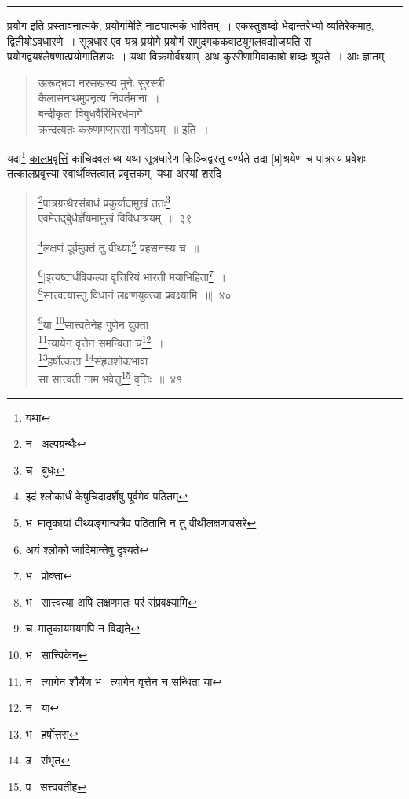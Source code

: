 \documentclass[11pt, openany]{book}
\begin{document}
\hrule

\vspace{5mm}
\noindent
\underline{प्रयोग} इति प्रस्तावनात्मके, \underline{प्रयोग}मिति नाट्यात्मकं भावितम्~। एकस्तुशब्दो भेदान्तरेभ्यो व्यतिरेकमाह, द्वितीयोऽवधारणे~। सूत्रधार एव यत्र प्रयोगे प्रयोगं समुद्गककवाटयुगलवद्योजयति स प्रयोगद्वयश्लेषणात्प्रयोगातिशयः~। यथा विक्रमोर्वश्याम्\textendash\ अथ कुररीणामिवाकाशे शब्दः श्रूयते~। आः ज्ञातम्\textendash

\begin{quote}
{\qt ऊरूद्भवा नरसखस्य मुनेः सुरस्त्री\\
कैलासनाथमुपनृत्य निवर्तमाना~।\\
बन्दीकृता विबुधवैरिभिरर्धमार्गे\\
क्रन्दत्यतः करुणमप्सरसां गणोऽयम्~॥} इति~।
\end{quote}

\noindent
यदा\renewcommand{\thefootnote}{1}\footnote{यथा} \underline{कालप्रवृत्तिं} कांचिदवलम्ब्य यथा सूत्रधारेण किञ्चिद्वस्तु वर्ण्यते तदा [प्र]श्रयेण च पात्रस्य प्रवेशः तत्कालप्रवृत्त्या स्वार्थोक्तत्वात् प्रवृत्तकम्, यथा {\qt अस्यां शरदि\textendash }

\newpage

\begin{quote}
{\na \renewcommand{\thefootnote}{1}\footnote{न \textendash\ अल्पग्रन्थैः}पात्रग्रन्थैरसंबाधं प्रकुर्यादामुखं ततः\renewcommand{\thefootnote}{2}\footnote{च \textendash\ बुधः}~।\\
एवमेतद्बुेधैर्ज्ञेयमामुखं विविधाश्रयम्~॥~३९

\renewcommand{\thefootnote}{3}\footnote{इदं श्लोकार्धं केषुचिदादर्शेषु पूर्वमेव पठितम्}लक्षणं पूर्वमुक्तं तु वीथ्याः\renewcommand{\thefootnote}{4}\footnote{भ\textendash\ मातृकायां वीथ्यङ्गान्यत्रैव पठितानि न तु वीथीलक्षणावसरे} प्रहसनस्य च~॥

\renewcommand{\thefootnote}{5}\footnote{अयं श्लोको जादिमान्तेषु दृश्यते}[इत्यष्टार्धविकल्पा वृत्तिरियं भारती मयाभिहिता\renewcommand{\thefootnote}{6}\footnote{भ \textendash\ प्रोक्ता}~।\\
\renewcommand{\thefootnote}{7}\footnote{भ \textendash\ सात्त्वत्या अपि लक्षणमतः परं संप्रवक्ष्यामि}सात्त्वत्यास्तु विधानं लक्षणयुक्त्या प्रवक्ष्यामि~॥]~४०

\renewcommand{\thefootnote}{8}\footnote{च\textendash\ मातृकायमयमपि न विद्यते}या \renewcommand{\thefootnote}{9}\footnote{भ \textendash\ सात्त्विकेन}सात्त्वतेनेह गुणेन युक्ता\\
\renewcommand{\thefootnote}{10}\footnote{न \textendash\ त्यागेन शौर्येण भ \textendash\ त्यागेन वृत्तेन च सन्धिता या}न्यायेन वृत्तेन समन्विता च\renewcommand{\thefootnote}{11}\footnote{न \textendash\ या}~।\\
\renewcommand{\thefootnote}{12}\footnote{भ \textendash\ हर्षोत्तरा}हर्षोत्कटा \renewcommand{\thefootnote}{13}\footnote{ढ \textendash\ संभृत}संहृतशोकभावा\\
सा सात्त्वती नाम भवेत्तु\renewcommand{\thefootnote}{14}\footnote{प \textendash\ सत्त्ववतीह} वृत्तिः~॥~४१}
\end{quote}
\end{document}
